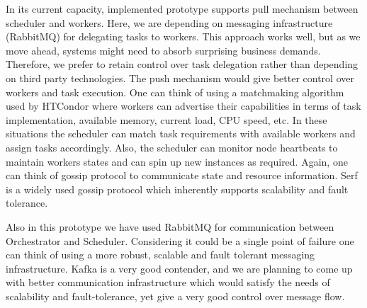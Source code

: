 \documentclass[sigconf]{acmart}
\begin{document}
In its current capacity, implemented prototype supports pull mechanism between scheduler and workers. Here, we are depending on messaging infrastructure (RabbitMQ) for delegating tasks to workers. This approach works well, but as we move ahead, systems might need to absorb surprising business demands.  Therefore, we prefer to retain control over task delegation rather than depending on third party technologies. The push mechanism would give better control over workers and task execution. One can think of using a matchmaking algorithm used by HTCondor where workers can advertise their capabilities in terms of task implementation, available memory, current load, CPU speed, etc.  In these situations the scheduler can match task requirements with available workers and assign tasks accordingly. Also, the scheduler can monitor node heartbeats to maintain worker\textquotesingle s states and can spin up new instances as required. Again, one can think of gossip protocol to communicate state and resource information. Serf is a widely used gossip protocol which inherently supports scalability and fault tolerance. \newline

Also in this prototype we have used RabbitMQ for communication between Orchestrator and Scheduler. Considering it could be a single point of failure one can think of using a more robust, scalable and fault tolerant messaging infrastructure. Kafka is a very good contender, and we are planning to come up with better communication infrastructure which would satisfy the needs of scalability and fault-tolerance, yet give a very good control over message flow.   

%
%


 
\end{document}
